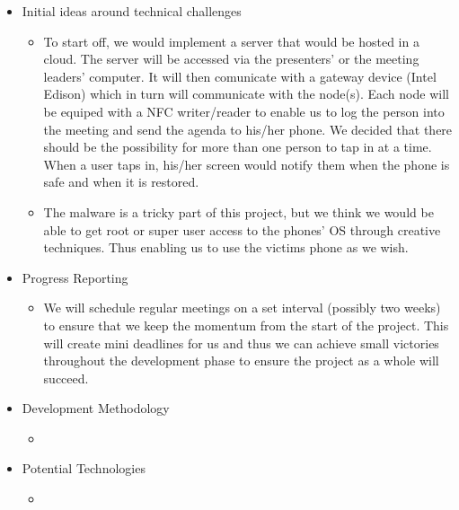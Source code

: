 \begin{itemize}
	\item Initial ideas around technical challenges
	\begin{itemize}
		\item[] To start off, we would implement a server that would be hosted in a cloud. The server will be accessed via the presenters' or the meeting leaders' computer. It will then comunicate with a gateway device (Intel Edison) which in turn will communicate with the node(s). Each node will be equiped with a NFC writer/reader to enable us to log the person into the meeting and send the agenda to his/her phone. We decided that there should be the possibility for more than one person to tap in at a time. When a user taps in, his/her screen would notify them when the phone is safe and when it is restored.
		\item[] The malware is a tricky part of this project, but we think we would be able to get root or super user access to the phones' OS through creative techniques. Thus enabling us to use the victims phone as we wish.
	\end{itemize}
	
	\item Progress Reporting
	\begin{itemize}
		\item[] We will schedule regular meetings on a set interval (possibly two weeks) to ensure that we keep the momentum from the start of the project. This will create mini deadlines for us and thus we can achieve small victories throughout the development phase to ensure the project as a whole will succeed.
	\end{itemize}
	
	\item Development Methodology
	\begin{itemize}
		\item[] %
	\end{itemize}
	
	\item Potential Technologies
	\begin{itemize}
		\item[] %
	\end{itemize}
	

\end{itemize}
